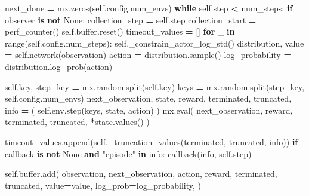 \documentclass[
  american,
  11pt,
  letterpaper,
]{article}
\newenvironment{Shaded}{\begin{snugshade}}{\end{snugshade}}
\newcommand{\BuiltInTok}[1]{#1}
\newcommand{\ControlFlowTok}[1]{\textcolor[rgb]{0.13,0.29,0.53}{\textbf{#1}}}
\newcommand{\KeywordTok}[1]{\textcolor[rgb]{0.13,0.29,0.53}{\textbf{#1}}}
\newcommand{\NormalTok}[1]{#1}
\newcommand{\OperatorTok}[1]{\textcolor[rgb]{0.81,0.36,0.00}{\textbf{#1}}}
\newcommand{\StringTok}[1]{\textcolor[rgb]{0.31,0.60,0.02}{#1}}
\newcommand{\VariableTok}[1]{\textcolor[rgb]{0.00,0.00,0.00}{#1}}
\renewenvironment{Shaded}{\par\smallskip}{\par\smallskip}
\begin{document}
\begin{Shaded}
\begin{Highlighting}[]
\NormalTok{        next\_done }\OperatorTok{=}\NormalTok{ mx.zeros(}\VariableTok{self}\NormalTok{.config.num\_envs)}
        \ControlFlowTok{while} \VariableTok{self}\NormalTok{.step }\OperatorTok{\textless{}}\NormalTok{ num\_steps:}
            \ControlFlowTok{if}\NormalTok{ observer }\KeywordTok{is} \KeywordTok{not} \VariableTok{None}\NormalTok{:}
\NormalTok{                collection\_step }\OperatorTok{=} \VariableTok{self}\NormalTok{.step}
\NormalTok{                collection\_start }\OperatorTok{=}\NormalTok{ perf\_counter()}
            \VariableTok{self}\NormalTok{.}\BuiltInTok{buffer}\NormalTok{.reset()}
\NormalTok{            timeout\_values }\OperatorTok{=}\NormalTok{ []}
            \ControlFlowTok{for}\NormalTok{ \_ }\KeywordTok{in} \BuiltInTok{range}\NormalTok{(}\VariableTok{self}\NormalTok{.config.num\_steps):}
                \VariableTok{self}\NormalTok{.\_constrain\_actor\_log\_std()}
\NormalTok{                distribution, value }\OperatorTok{=} \VariableTok{self}\NormalTok{.network(observation)}
\NormalTok{                action }\OperatorTok{=}\NormalTok{ distribution.sample()}
\NormalTok{                log\_probability }\OperatorTok{=}\NormalTok{ distribution.log\_prob(action)}

                \VariableTok{self}\NormalTok{.key, step\_key }\OperatorTok{=}\NormalTok{ mx.random.split(}\VariableTok{self}\NormalTok{.key)}
\NormalTok{                keys }\OperatorTok{=}\NormalTok{ mx.random.split(step\_key, }\VariableTok{self}\NormalTok{.config.num\_envs)}
\NormalTok{                next\_observation, state, reward, terminated, truncated, info }\OperatorTok{=}\NormalTok{ (}
                    \VariableTok{self}\NormalTok{.env.step(keys, state, action)}
\NormalTok{                )}
\NormalTok{                mx.}\BuiltInTok{eval}\NormalTok{(}
\NormalTok{                    next\_observation, reward, terminated, truncated, }\OperatorTok{*}\NormalTok{state.values()}
\NormalTok{                )}

\NormalTok{                timeout\_values.append(}\VariableTok{self}\NormalTok{.\_truncation\_values(terminated, truncated, info))}
                \ControlFlowTok{if}\NormalTok{ callback }\KeywordTok{is} \KeywordTok{not} \VariableTok{None} \KeywordTok{and} \StringTok{"episode"} \KeywordTok{in}\NormalTok{ info:}
\NormalTok{                    callback(info, }\VariableTok{self}\NormalTok{.step)}

                \VariableTok{self}\NormalTok{.}\BuiltInTok{buffer}\NormalTok{.add(}
\NormalTok{                    observation,}
\NormalTok{                    next\_observation,}
\NormalTok{                    action,}
\NormalTok{                    reward,}
\NormalTok{                    terminated,}
\NormalTok{                    truncated,}
\NormalTok{                    value}\OperatorTok{=}\NormalTok{value,}
\NormalTok{                    log\_prob}\OperatorTok{=}\NormalTok{log\_probability,}
\NormalTok{                )}


\end{Highlighting}
\end{Shaded}
\end{document}
